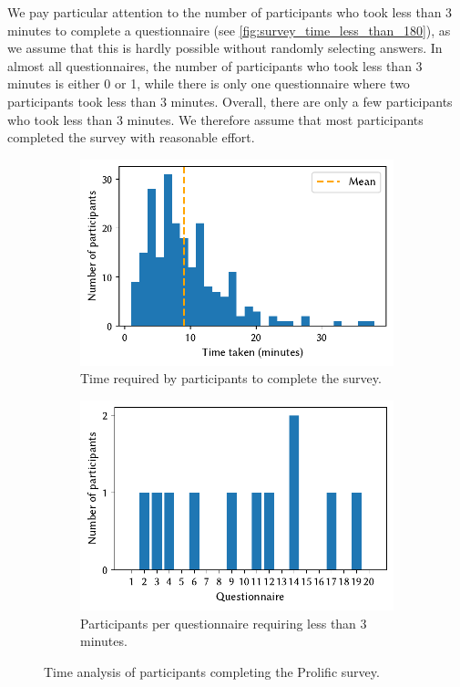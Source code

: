 \documentclass[%
class=scrreprt,
chapterprefix=false,%
open=right,%
twoside=false,%
paper=a4,%
logofile={Logo\_zentral\_farbig\_EN.png},%
thesistype=master,%
UKenglish,%
]{se2thesis}
\theoremstyle{definition}
\begin{document}
	We pay particular attention to the number of participants who took less than 3 minutes to complete a questionnaire (see \autoref{fig:survey_time_less_than_180}), as we assume that this is hardly possible without randomly selecting answers. In almost all questionnaires, the number of participants who took less than 3 minutes is either 0 or 1, while there is only one questionnaire where two participants took less than 3 minutes.
	Overall, there are only a few participants who took less than 3 minutes. We therefore assume that most participants completed the survey with reasonable effort.
		
	\begin{figure}[tb]
		\centering
		\begin{subfigure}{0.49\textwidth}
			\includegraphics[width=\linewidth]{img/survey_time_histogramm.pdf}
			\caption{Time required by participants to complete the survey.}
			\label{fig:survey_time_histogramm}
		\end{subfigure}
		\hfill
		\begin{subfigure}{0.49\textwidth}
			\includegraphics[width=\linewidth]{img/survey_time_less_than_180.pdf}
			\caption{Participants per questionnaire requiring less than 3 minutes.}
			\label{fig:survey_time_less_than_180}
		\end{subfigure}
		\caption{Time analysis of participants completing the Prolific survey.}
		\label{fig:survey_time_prolific}
	\end{figure}
	
\end{document}

